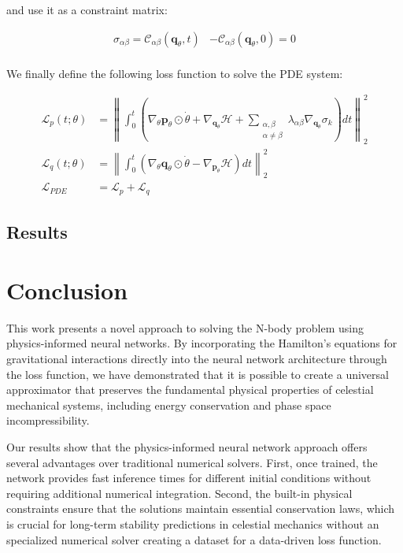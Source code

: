 \documentclass[draft]{agujournal2019}
\newcommand{\norm}[1]{\left\lVert#1\right\rVert}
\begin{document}
and use it as a constraint matrix:

\begin{align*}
    \sigma_{\alpha\beta} = \mathcal{C}_{\alpha\beta} \left(\mathbf{q}_\theta, t\right) &- \mathcal{C}_{\alpha\beta}\left(\mathbf{q}_\theta, 0\right) = 0 \\
\end{align*}

We finally define the following loss function to solve the PDE system:

\begin{align*}
    \mathcal{L}_{p}(t; \theta) &= \norm{\int_0^t \left(\nabla_\theta \mathbf{p}_\theta \odot \dot{\theta} + \nabla_{\mathbf{q}_\theta} \mathcal{H} + \sum_{\substack{\alpha, \beta \\ \alpha \neq \beta}} \lambda_{\alpha\beta} \nabla_{\mathbf{q}_\theta} \sigma_k\right) dt}_2^2 \\
    \mathcal{L}_{q}(t; \theta) &= \norm{\int_0^t \left(\nabla_\theta \mathbf{q}_\theta \odot \dot{\theta} - \nabla_{\mathbf{p}_\theta} \mathcal{H}\right) dt}^2_2 \\
    \mathcal{L}_{PDE} &= \mathcal{L}_{p} + \mathcal{L}_{q}
\end{align*}


\subsection{Results}

\section{Conclusion}
This work presents a novel approach to solving the N-body problem using physics-informed neural networks. By incorporating the Hamilton's equations for gravitational interactions directly into the neural network architecture through the loss function, we have demonstrated that it is possible to create a universal approximator that preserves the fundamental physical properties of celestial mechanical systems, including energy conservation and phase space incompressibility.

Our results show that the physics-informed neural network approach offers several advantages over traditional numerical solvers. First, once trained, the network provides fast inference times for different initial conditions without requiring additional numerical integration. Second, the built-in physical constraints ensure that the solutions maintain essential conservation laws, which is crucial for long-term stability predictions in celestial mechanics without an specialized numerical solver creating a dataset for a data-driven loss function.
\end{document}
